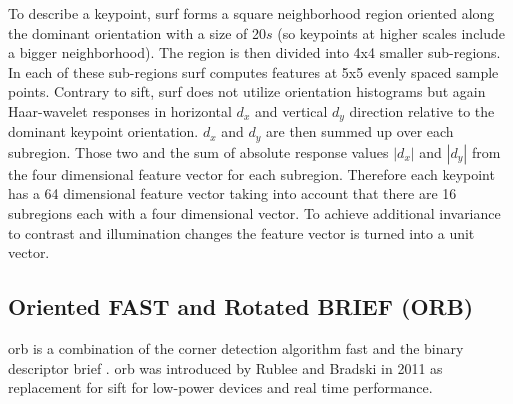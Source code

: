 To describe a keypoint, \gls{surf} forms a square neighborhood region oriented along the dominant orientation with a size of 20$s$ {(so keypoints at higher scales include a bigger neighborhood)}. The region is then divided into 4x4 smaller sub-regions. In each of these sub-regions \gls{surf} computes features at 5x5 evenly spaced sample points. Contrary to \gls{sift}, \gls{surf} does not utilize orientation histograms but again Haar-wavelet responses in horizontal $d_x$ and vertical $d_y$ direction relative to the dominant keypoint orientation. $d_x$ and $d_y$ are then summed up over each subregion. Those two and the sum of absolute response values $|d_x|$ and $|d_y|$ from the four dimensional feature vector for each subregion. Therefore each keypoint has a 64 dimensional feature vector taking into account that there are 16 subregions each with a four dimensional vector. To achieve additional invariance to contrast and illumination changes the feature vector is turned into a unit vector.    

\subsection[ORB]{Oriented FAST and Rotated BRIEF (ORB)}
\gls{orb} is a combination of the corner detection algorithm \gls{fast} \cite{Rosten} and the binary descriptor \gls{brief} \cite{Calonder2010}. \gls{orb} was introduced by Rublee and Bradski in 2011 \cite{Rublee2011} as replacement for \gls{sift} for low-power devices and real time performance.

